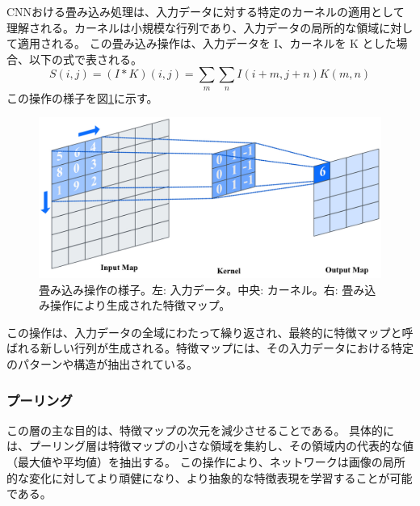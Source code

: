         CNNおける畳み込み処理は、入力データに対する特定のカーネルの適用として理解される。カーネルは小規模な行列であり、入力データの局所的な領域に対して適用される。
        この畳み込み操作は、入力データを I、カーネルを K とした場合、以下の式で表される。
        \begin{equation}
          S(i, j) = (I * K)(i, j) = \sum_{m}\sum_{n}I(i+m, j+n)K(m, n)
        \end{equation}
        この操作の様子を図\ref{fig:convolution}に示す。
        \begin{figure}[h]
          \centering
          \includegraphics[width=\textwidth]{figures/videoprediction/convolution.jpg}
          \caption{畳み込み操作の様子。左: 入力データ。中央: カーネル。右: 畳み込み操作により生成された特徴マップ。}
          \label{fig:convolution}
        \end{figure}
        この操作は、入力データの全域にわたって繰り返され、最終的に特徴マップと呼ばれる新しい行列が生成される。特徴マップには、その入力データにおける特定のパターンや構造が抽出されている。
      
      \subsubsection{プーリング}
        この層の主な目的は、特徴マップの次元を減少させることである。
        具体的には、プーリング層は特徴マップの小さな領域を集約し、その領域内の代表的な値（最大値や平均値）を抽出する。
        この操作により、ネットワークは画像の局所的な変化に対してより頑健になり、より抽象的な特徴表現を学習することが可能である。

